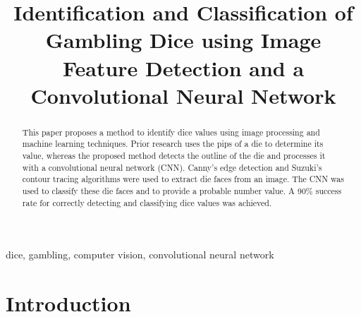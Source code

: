 \documentclass[conference]{IEEEtran}
\begin{document}
\title{
	Identification and Classification of Gambling Dice using Image Feature Detection and a Convolutional Neural Network
}

\author{
	\and
}

\maketitle

\begin{abstract}
	This paper proposes a method to identify dice values using image processing and machine learning techniques.
	Prior research uses the pips of a die to determine its value, whereas the proposed method detects the outline of the die and processes it with a convolutional neural network (CNN).
	Canny's edge detection and Suzuki's contour tracing algorithms were used to extract die faces from an image.
	The CNN was used to classify these die faces and to provide a probable number value.
	A 90\% success rate for correctly detecting and classifying dice values was achieved.
\end{abstract}

\begin{IEEEkeywords}
	dice, gambling, computer vision, convolutional neural network
\end{IEEEkeywords}

\section{Introduction}
\end{document}
